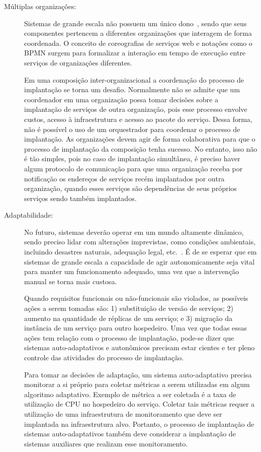 \begin{description}
\item [Múltiplas organizações:]

Sistemas de grande escala não possuem um único dono~\cite{Steen2011VeryLarge}, 
sendo que seus componentes pertencem a diferentes organizações que interagem de forma coordenada. 
O conceito de coreografias de serviços web e notações como o BPMN surgem para 
formalizar a interação em tempo de execução entre serviços de organizações diferentes.

Em uma composição inter-organizacional a coordenação do processo de implantação se torna um desafio. Normalmente não se admite que um coordenador em uma organização possa tomar decisões 
sobre a implantação de serviços de outra organização, pois esse processo envolve
custos, acesso à infraestrutura e acesso ao pacote do serviço.
Dessa forma, não é possível o uso de um orquestrador para coordenar o processo de implantação.
As organizações devem agir de forma colaborativa para que o processo de implantação
da composição tenha sucesso.
No entanto, isso não é tão simples, pois no caso de implantação simultânea,
é preciso haver algum protocolo de comunicação para que uma organização receba
por notificação os endereços de serviços recém implantados por outra organização,
quando esses serviços são dependências de seus próprios serviços sendo também implantados.

\item [Adaptabilidade:]

No futuro, sistemas deverão operar em um mundo altamente dinâmico,
sendo preciso lidar com alterações imprevistas, como condições ambientais, incluindo desastres naturais, 
adequação legal, etc.~\cite{Papazoglou2008Journey}.
É de se esperar que em sistemas de grande escala a capacidade de agir autonomicamente 
seja vital para manter um funcionamento adequado, uma vez que a intervenção manual
se torna mais custosa.

Quando requisitos funcionais ou não-funcionais são violados, as possíveis ações a serem tomadas são:
1) substituição de versão de serviços; 2) aumento na quantidade de réplicas de um serviço; e
3) migração da instância de um serviço para outro hospedeiro.
Uma vez que todas essas ações tem relação com o processo de implantação,
pode-se dizer que sistemas auto-adaptativos e autonômicos precisam estar cientes
e ter pleno controle das atividades do processo de implantação.

Para tomar as decisões de adaptação, um sistema auto-adaptativo precisa monitorar
a si próprio para coletar métricas a serem utilizadas em algum algoritmo adaptativo.
Exemplo de métrica a ser coletada é a taxa de utilização de CPU no hospedeiro do serviço.
Coletar tais métricas requer a utilização de uma infraestrutura de monitoramento
que deve ser implantada na infraestrutura alvo.
Portanto, o processo de implantação de sistemas auto-adaptativos
também deve considerar a implantação de sistemas auxiliares que realizam esse monitoramento.


\end{description}



